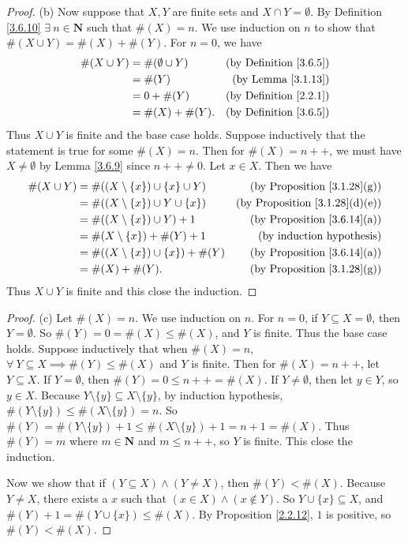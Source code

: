 \begin{proof}{(b)}
Now suppose that \(X, Y\) are finite sets and \(X \cap Y = \emptyset\).
By Definition \ref{3.6.10} \(\exists\ n \in \mathbf{N}\) such that \(\#(X) = n\).
We use induction on \(n\) to show that \(\#(X \cup Y) = \#(X) + \#(Y)\).
For \(n = 0\), we have
\begin{align*}
\#(X \cup Y) &= \#(\emptyset \cup Y) & \text{(by Definition \ref{3.6.5})} \\
&= \#(Y) & \text{(by Lemma \ref{3.1.13})} \\
&= 0 + \#(Y) & \text{(by Definition \ref{2.2.1})} \\
&= \#(X) + \#(Y). & \text{(by Definition \ref{3.6.5})}
\end{align*}
Thus \(X \cup Y\) is finite and the base case holds.
Suppose inductively that the statement is true for some \(\#(X) = n\).
Then for \(\#(X) = n++\), we must have \(X \neq \emptyset\) by Lemma \ref{3.6.9} since \(n++ \neq 0\).
Let \(x \in X\).
Then we have
\begin{align*}
\#(X \cup Y) &= \#((X \setminus \{x\}) \cup \{x\} \cup Y) & \text{(by Proposition \ref{3.1.28}(g))} \\
&= \#((X \setminus \{x\}) \cup Y \cup \{x\}) & \text{(by Proposition \ref{3.1.28}(d)(e))} \\
&= \#((X \setminus \{x\}) \cup Y) + 1 & \text{(by Proposition \ref{3.6.14}(a))} \\
&= \#(X \setminus \{x\}) + \#(Y) + 1 & \text{(by induction hypothesis)} \\
&= \#((X \setminus \{x\}) \cup \{x\}) + \#(Y) & \text{(by Proposition \ref{3.6.14}(a))} \\
&= \#(X) + \#(Y). & \text{(by Proposition \ref{3.1.28}(g))}
\end{align*}
Thus \(X \cup Y\) is finite and this close the induction.
\end{proof}

\begin{proof}{(c)}
Let \(\#(X) = n\).
We use induction on \(n\).
For \(n = 0\), if \(Y \subseteq X = \emptyset\), then \(Y = \emptyset\).
So \(\#(Y) = 0 = \#(X) \leq \#(X)\), and \(Y\) is finite.
Thus the base case holds.
Suppose inductively that when \(\#(X) = n\), \(\forall\ Y \subseteq X \implies \#(Y) \leq \#(X)\) and \(Y\) is finite.
Then for \(\#(X) = n++\), let \(Y \subseteq X\).
If \(Y = \emptyset\), then \(\#(Y) = 0 \leq n++ = \#(X)\).
If \(Y \neq \emptyset\), then let \(y \in Y\), so \(y \in X\).
Because \(Y \setminus \{y\}  \subseteq X \setminus \{y\}\), by induction hypothesis, \(\#(Y \setminus \{y\}) \leq \#(X \setminus \{y\}) = n\).
So \(\#(Y) = \#(Y \setminus \{y\}) + 1 \leq \#(X \setminus \{y\}) + 1 = n + 1 = \#(X)\).
Thus \(\#(Y) = m\) where \(m \in \mathbf{N}\) and \(m \leq n++\), so \(Y\) is finite.
This close the induction.

Now we show that if \((Y \subseteq X) \land (Y \neq X)\), then \(\#(Y) < \#(X)\).
Because \(Y \neq X\), there exists a \(x\) such that \((x \in X) \land (x \notin Y)\).
So \(Y \cup \{x\} \subseteq X\), and \(\#(Y) + 1 = \#(Y \cup \{x\}) \leq \#(X)\).
By Proposition \ref{2.2.12}, \(1\) is positive, so \(\#(Y) < \#(X)\).
\end{proof}


